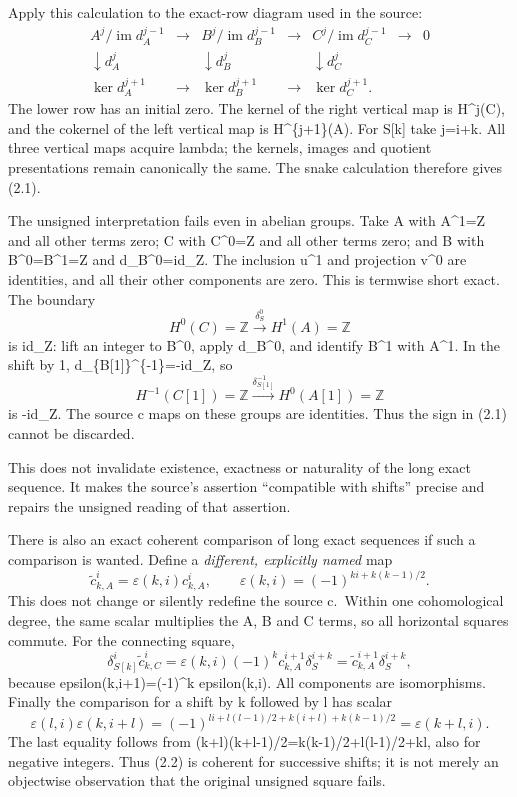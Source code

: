 \documentclass[11pt]{article}
\begin{document}
Apply this calculation to the exact-row diagram used in the source: \[
\begin{array}{ccccccc}
A^j/\operatorname{im}d_A^{j-1}&\longrightarrow&
B^j/\operatorname{im}d_B^{j-1}&\longrightarrow&
C^j/\operatorname{im}d_C^{j-1}&\longrightarrow&0\\
\downarrow d_A^j&&\downarrow d_B^j&&\downarrow d_C^j\\
\ker d_A^{j+1}&\longrightarrow&
\ker d_B^{j+1}&\longrightarrow&\ker d_C^{j+1}.
\end{array}
\] The lower row has an initial zero. The kernel of the right vertical map is H\^{}j(C), and the cokernel of the left vertical map is H\^{}\{j+1\}(A). For S{[}k{]} take j=i+k. All three vertical maps acquire lambda; the kernels, images and quotient presentations remain canonically the same. The snake calculation therefore gives (2.1).

The unsigned interpretation fails even in abelian groups. Take A with A\^{}1=Z and all other terms zero; C with C\^{}0=Z and all other terms zero; and B with B\^{}0=B\^{}1=Z and d\_B\^{}0=id\_Z. The inclusion u\^{}1 and projection v\^{}0 are identities, and all their other components are zero. This is termwise short exact. The boundary \[
H^0(C)=\mathbb Z\xrightarrow{\delta_S^0}H^1(A)=\mathbb Z
\] is id\_Z: lift an integer to B\^{}0, apply d\_B\^{}0, and identify B\^{}1 with A\^{}1. In the shift by 1, d\_\{B{[}1{]}\}\^{}\{-1\}=-id\_Z, so \[
H^{-1}(C[1])=\mathbb Z
\xrightarrow{\delta_{S[1]}^{-1}}
H^0(A[1])=\mathbb Z
\] is -id\_Z. The source c maps on these groups are identities. Thus the sign in (2.1) cannot be discarded.

This does not invalidate existence, exactness or naturality of the long exact sequence. It makes the source's assertion ``compatible with shifts'' precise and repairs the unsigned reading of that assertion.

There is also an exact coherent comparison of long exact sequences if such a comparison is wanted. Define a \emph{different, explicitly named} map \[
\widetilde c_{k,A}^i
=\varepsilon(k,i)c_{k,A}^i,\qquad
\varepsilon(k,i)=(-1)^{ki+k(k-1)/2}.                         \tag{2.2}
\] This does not change or silently redefine the source c.~Within one cohomological degree, the same scalar multiplies the A, B and C terms, so all horizontal squares commute. For the connecting square, \[
\delta_{S[k]}^i\widetilde c_{k,C}^i
=\varepsilon(k,i)(-1)^k c_{k,A}^{i+1}\delta_S^{i+k}
=\widetilde c_{k,A}^{i+1}\delta_S^{i+k},
\] because epsilon(k,i+1)=(-1)\^{}k epsilon(k,i). All components are isomorphisms. Finally the comparison for a shift by k followed by l has scalar \[
\varepsilon(l,i)\varepsilon(k,i+l)
=(-1)^{li+l(l-1)/2+k(i+l)+k(k-1)/2}
=\varepsilon(k+l,i).
\] The last equality follows from (k+l)(k+l-1)/2=k(k-1)/2+l(l-1)/2+kl, also for negative integers. Thus (2.2) is coherent for successive shifts; it is not merely an objectwise observation that the original unsigned square fails.
\end{document}
